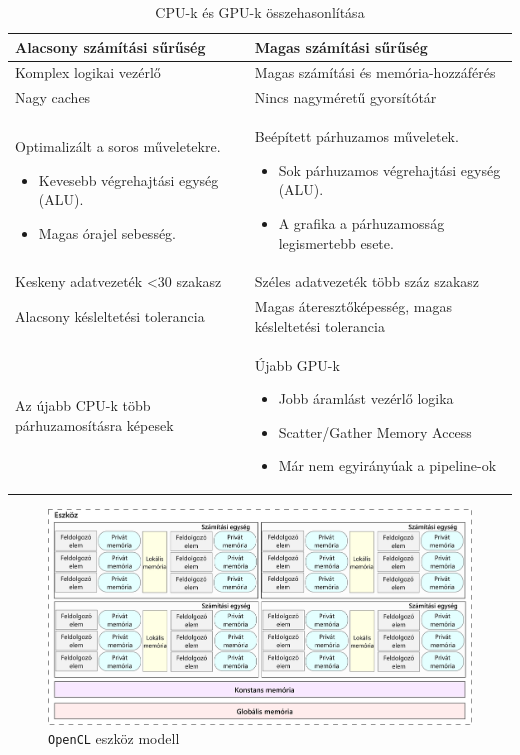 \begin{table}[h!]
\centering
\caption{CPU-k és GPU-k összehasonlítása}
\medskip
\label{tab:cpuvsgpu}
\begin{tabular}{|p{7cm}|p{7cm}|}
\hline
Alacsony számítási sűrűség & Magas számítási sűrűség \\
\hline
Komplex logikai vezérlő & Magas számítási és memória-hozzáférés \\
\hline
Nagy caches & Nincs nagyméretű gyorsítótár  \\
\hline
Optimalizált a soros műveletekre.
\begin{itemize}
	\item Kevesebb végrehajtási egység (ALU).
	\item Magas órajel sebesség.
\end{itemize} & Beépített párhuzamos műveletek.
\begin{itemize}
	\item Sok párhuzamos végrehajtási egység (ALU).
	\item A grafika a párhuzamosság legismertebb esete.
\end{itemize} \\
\hline
Keskeny adatvezeték <30 szakasz & Széles adatvezeték több száz szakasz \\
\hline
Alacsony késleltetési tolerancia & Magas áteresztőképesség, magas késleltetési tolerancia \\
\hline
Az újabb CPU-k több párhuzamosításra képesek & Újabb GPU-k
\begin{itemize}
	\item Jobb áramlást vezérlő logika
	\item Scatter/Gather Memory Access
	\item Már nem egyirányúak a pipeline-ok
\end{itemize} \\
\hline
\end{tabular}
\end{table}



\begin{figure}[h!]
\centering
\includegraphics[width=\textwidth]{images/device.png}
\caption{\texttt{OpenCL} eszköz modell}
\label{fig:opencl}
\end{figure}

